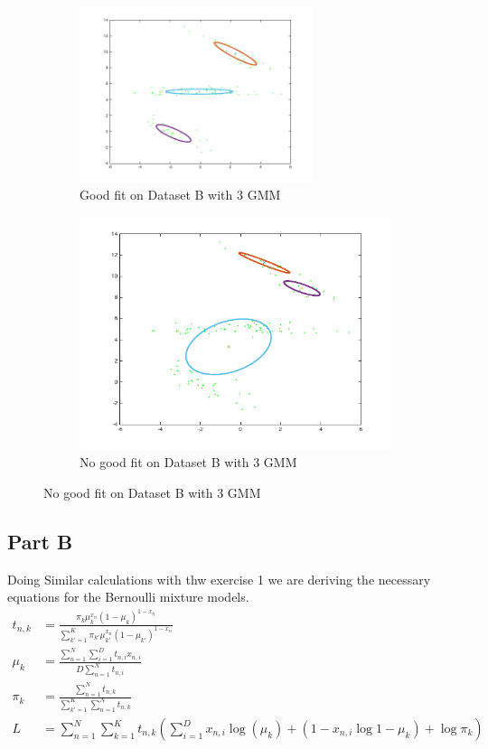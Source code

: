 \begin{figure}[ht]
\begin{subfigure}[b]{0.5\linewidth}
    \centering
    \includegraphics[width=0.75\textwidth]{figures/mixmodelB_3_20.png}
    \caption{Good fit on Dataset B with 3 GMM}
    \vspace{4ex}
 \end{subfigure}%
  \begin{subfigure}[b]{0.5\linewidth}
  \centering
\includegraphics[width=0.75\linewidth]{figures/mixmodelB_3_500.png}
\caption{No good fit on Dataset B with 3 GMM}
\vspace{4ex}
\end{subfigure}%
\end{figure}

\subsection*{Part B}
Doing Similar calculations with thw exercise 1 we are deriving the necessary
equations for the Bernoulli mixture models.
\begin{align*}
t_{n,k} &= \frac{\pi_{k}\mu_{k}^{x_{n}} (1-\mu_{k})^{1-x_{n}}}{\sum_{k'=1}^K \pi_{k'} \mu_{k'}^{x_{n}}(1-\mu_{k'})^{1-x_n}}\\
\mu_{k} &= \frac{\sum_{n=1}^N\sum_{i=1}^{D} t_{n,i}x_{n,i}}{D\sum_{n=1}^N t_{n,i}}\\
\pi_{k} &= \frac{\sum_{n=1}^{N}t_{n,k}}{\sum_{k'=1}^K\sum_{n=1}^{N}t_{n,k}}\\
L &= \sum_{n=1}^{N}\sum_{k=1}^{K}t_{n,k}(\sum_{i=1}^{D}x_{n,i}\log(\mu_{k})+(1-x_{n,i}\log{1-\mu_{k}}) + \log\pi_{k})
\end{align*}
